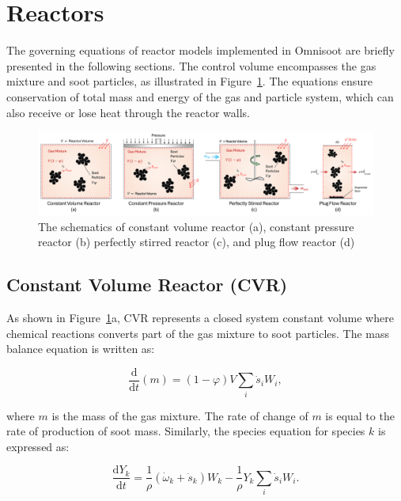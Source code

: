 \section{Reactors}

The governing equations of reactor models implemented in Omnisoot are briefly presented in the following sections. The control volume encompasses the gas mixture and soot particles, as illustrated in Figure~\ref{fig:reactors}. The equations ensure conservation of total mass and energy of the gas and particle system, which can also receive or lose heat through the reactor walls.



\begin{figure}[H]
	\centering
	\includegraphics[width=1\textwidth]{Figures/Theory/reactors.pdf}
	\caption{The schematics of constant volume reactor (a), constant pressure reactor (b) perfectly stirred reactor (c), and plug flow reactor (d)}
	\label{fig:reactors} 
\end{figure}


\subsection{Constant Volume Reactor (CVR)}
\label{sec:cvr}
As shown in Figure~\ref{fig:reactors}a, CVR represents a closed system constant volume where chemical reactions converts part of the gas mixture to soot particles. The mass balance equation is written as:

\begin{equation}
	\frac{\mathrm{d}}{\mathrm{d}t}(m) = (1-\varphi)V \sum_i \dot s_i W_i,
	\label{eqn:contconstuv}
\end{equation} 

\noindent where $m$ is the mass of the gas mixture. The rate of change of $m$ is equal to the rate of production of soot mass.
Similarly, the species equation for species $k$ is expressed as:

\begin{equation}
	\frac{\mathrm{d}Y_k}{\mathrm{d}t}
	=
	\frac{1}{\rho}
	\left(
	{\dot{\omega}}_k
	+
	{\dot{s}}_k
	\right)W_k
	-\frac{1}{\rho}Y_k\sum_{i}{{\dot{s}}_i W_i}
	\label{eqn:speciesconstuv}.
\end{equation}

